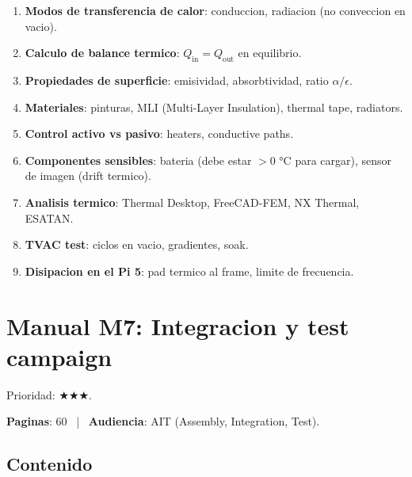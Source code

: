 \documentclass[11pt,a4paper,oneside]{report}
\begin{document}
\begin{enumerate}[leftmargin=2em]
  \item \textbf{Modos de transferencia de calor}: conduccion, radiacion
        (no conveccion en vacio).
  \item \textbf{Calculo de balance termico}: $Q_{\text{in}} = Q_{\text{out}}$
        en equilibrio.
  \item \textbf{Propiedades de superficie}: emisividad, absorbtividad,
        ratio $\alpha/\epsilon$.
  \item \textbf{Materiales}: pinturas, MLI (Multi-Layer Insulation),
        thermal tape, radiators.
  \item \textbf{Control activo vs pasivo}: heaters, conductive paths.
  \item \textbf{Componentes sensibles}: bateria (debe estar $> 0$ °C para
        cargar), sensor de imagen (drift termico).
  \item \textbf{Analisis termico}: Thermal Desktop, FreeCAD-FEM,
        NX Thermal, ESATAN.
  \item \textbf{TVAC test}: ciclos en vacio, gradientes, soak.
  \item \textbf{Disipacion en el Pi 5}: pad termico al frame, limite de
        frecuencia.
\end{enumerate}

\chapter{Manual M7: Integracion y test campaign}

\begin{prioritario}
Prioridad: $\bigstar\bigstar\bigstar$.
\end{prioritario}

\textbf{Paginas}: 60 ~|~ \textbf{Audiencia}: AIT (Assembly, Integration,
Test).

\section{Contenido}
\end{document}
